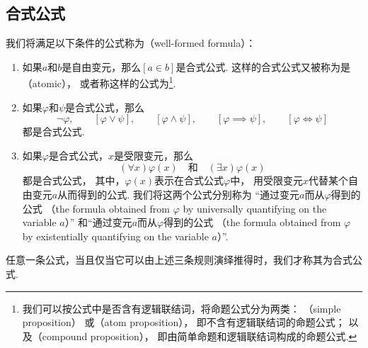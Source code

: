 \subsection{合式公式}
我们将满足以下条件的公式称为（well-formed formula）：%
\begin{enumerate}
	\item 如果\(a\)和\(b\)是自由变元，那么\([a \in b]\)是合式公式.
	这样的合式公式又被称为是（atomic），
	或者称这样的公式为\footnote{%
	我们可以按公式中是否含有逻辑联结词，将命题公式分为两类：
	（simple proposition）%
	或（atom proposition），
	即不含有逻辑联结词的命题公式；
	以及（compound proposition），
	即由简单命题和逻辑联结词构成的命题公式.
	}.

	\item 如果\(\varphi\)和\(\psi\)是合式公式，那么\[
		\neg \varphi, \qquad
		[\varphi \lor \psi], \qquad
		[\varphi \land \psi], \qquad
		[\varphi \implies \psi], \qquad
		[\varphi \iff \psi]
	\]都是合式公式.

	\item 如果\(\varphi\)是合式公式，\(x\)是受限变元，那么\[
		(\forall x) \varphi(x)
		\quad\text{和}\quad
		(\exists x) \varphi(x)
	\]都是合式公式，
	其中，\(\varphi(x)\)表示在合式公式\(\varphi\)中，
	用受限变元\(x\)代替某个自由变元\(a\)从而得到的公式.
	我们将这两个公式分别称为%
	“通过变元\(a\)而从\(\varphi\)得到的公式%
	（the formula obtained from \(\varphi\) by universally quantifying on the variable \(a\)）”%
	和“通过变元\(a\)而从\(\varphi\)得到的公式%
	（the formula obtained from \(\varphi\) by existentially quantifying on the variable \(a\)）”.
\end{enumerate}
任意一条公式，当且仅当它可以由上述三条规则演绎推得时，我们才称其为合式公式.


